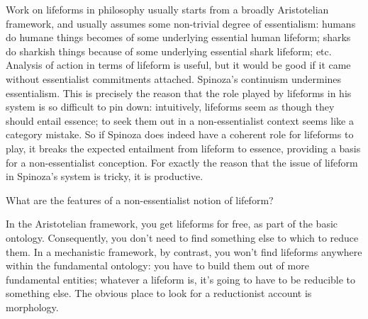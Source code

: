 \documentclass{article}
\begin{document}
Work on lifeforms in philosophy usually starts from a broadly Aristotelian framework, and usually assumes some non-trivial degree of essentialism: humans do humane things becomes of some underlying essential human lifeform; sharks do sharkish things because of some underlying essential shark lifeform; etc. Analysis of action in terms of lifeform is useful, but it would be good if it came without essentialist commitments attached. Spinoza's continuism undermines essentialism. This is precisely the reason that the role played by lifeforms in his system is so difficult to pin down: intuitively, lifeforms seem as though they should entail essence; to seek them out in a non-essentialist context seems like a category mistake. So if Spinoza does indeed have a coherent role for lifeforms to play, it breaks the expected entailment from lifeform to essence, providing a basis for a non-essentialist conception. For exactly the reason that the issue of lifeform in Spinoza's system is tricky, it is productive.

What are the features of a non-essentialist notion of lifeform?

In the Aristotelian framework, you get lifeforms for free, as part of the basic ontology. Consequently, you don't need to find something else to which to reduce them. In a mechanistic framework, by contrast, you won't find lifeforms anywhere within the fundamental ontology: you have to build them out of more fundamental entities; whatever a lifeform is, it's going to have to be reducible to something else. The obvious place to look for a reductionist account is morphology.
\end{document}
